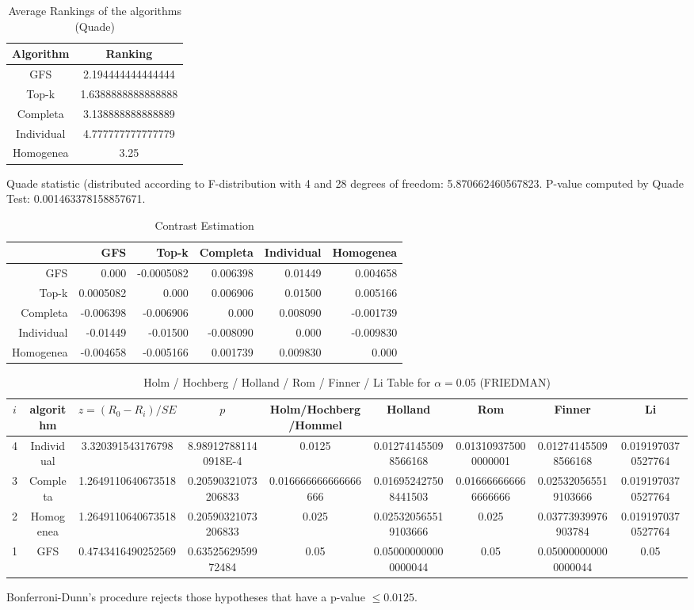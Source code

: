 \documentclass[a4paper,10pt]{article}
\begin{document}
\begin{landscape}
\newpage

\begin{table}[!htp]
\centering
\caption{Average Rankings of the algorithms (Quade)
}\begin{tabular}{c|c}
Algorithm&Ranking\\
\hline
GFS&2.194444444444444\\
Top-k&1.6388888888888888\\
Completa&3.138888888888889\\
Individual&4.777777777777779\\
Homogenea&3.25\\
\end{tabular}
\end{table}
Quade statistic (distributed according to F-distribution with 4 and 28 degrees of freedom: 5.870662460567823. 
P-value computed by Quade Test: 0.001463378158857671.\newline


\newpage

\begin{table}[!htp]
\centering\tiny
\caption{Contrast Estimation}
\begin{tabular}{
|r|r|r|r|r|r|}
\hline
 &GFS&Top-k&Completa&Individual&Homogenea\\
\hline
GFS&0.000&-0.0005082&0.006398&0.01449&0.004658\\
\hline
Top-k&0.0005082&0.000&0.006906&0.01500&0.005166\\
\hline
Completa&-0.006398&-0.006906&0.000&0.008090&-0.001739\\
\hline
Individual&-0.01449&-0.01500&-0.008090&0.000&-0.009830\\
\hline
Homogenea&-0.004658&-0.005166&0.001739&0.009830&0.000\\
\hline

\end{tabular}
\end{table}

\newpage

\begin{table}[!htp]
\centering\scriptsize
\caption{Holm / Hochberg / Holland / Rom / Finner / Li Table for $\alpha=0.05$ (FRIEDMAN)}
\begin{tabular}{ccccccccc}
$i$&algorithm&$z=(R_0 - R_i)/SE$&$p$&Holm/Hochberg/Hommel&Holland&Rom&Finner&Li\\
\hline
4&Individual&3.320391543176798&8.989127881140918E-4&0.0125&0.012741455098566168&0.013109375000000001&0.012741455098566168&0.0191970370527764\\
3&Completa&1.2649110640673518&0.20590321073206833&0.016666666666666666&0.016952427508441503&0.016666666666666666&0.025320565519103666&0.0191970370527764\\
2&Homogenea&1.2649110640673518&0.20590321073206833&0.025&0.025320565519103666&0.025&0.03773939976903784&0.0191970370527764\\
1&GFS&0.4743416490252569&0.6352562959972484&0.05&0.050000000000000044&0.05&0.050000000000000044&0.05\\
\hline
\end{tabular}
\end{table}
Bonferroni-Dunn's procedure rejects those hypotheses that have a p-value $\le0.0125$.



\end{landscape}
\end{document}
